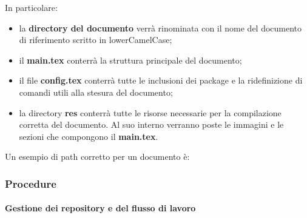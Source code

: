 \vspace{1cm}
\noindent In particolare:
\begin{itemize}
	\item la \textbf{directory del documento} verrà rinominata con il nome del documento di riferimento scritto in lowerCamelCase;
	\item il \textbf{main.tex} conterrà la struttura principale del documento;
	\item il file \textbf{config.tex} conterrà tutte le inclusioni dei package e la ridefinizione di comandi utili alla stesura del documento;
	\item la directory \textbf{res} conterrà tutte le risorse necessarie per la compilazione corretta del documento. Al suo interno verranno poste le immagini e le sezioni che compongono il \textbf{main.tex}.
\end{itemize}
Un esempio di path corretto per un documento è:\\

\centerline{}
\vspace{0.7cm}

\subsubsection{Procedure}
\paragraph{Gestione dei repository e del flusso di lavoro}

